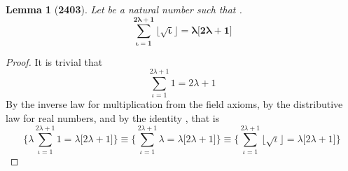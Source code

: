 \documentclass[preview]{standalone}
\newtheorem*{lemma*}{Lemma}
\begin{document}
\begin{lemma*}[\textbf{2403}]
    Let \bm{$\iota$} be a natural number such that
    \bm{$\big \lfloor \sqrt \iota \big \rfloor = \lambda$}.
    \begin{equation*}
        \bm{
            \sum_{\iota=1}^{2 \lambda + 1} 
                    \big \lfloor \sqrt \iota \big \rfloor
                =
            \lambda \big[ 2 \lambda + 1 \big]
        }
    \end{equation*}
\end{lemma*}

\begin{proof}
    It is trivial that
    \begin{equation*}
        \sum_{\iota=1}^{2 \lambda + 1} 
                1 = 2 \lambda + 1
    \end{equation*}
    By the inverse law for multiplication from the field axioms,
    by the distributive law for real numbers, and by the identity \bm{$\lambda$},
    that is
    \begin{equation*}
        \Bigg\{
            \lambda \sum_{\iota=1}^{2 \lambda + 1} 1 = \lambda \big[ 2 \lambda + 1 \big]
        \Bigg\}
                \equiv
        \Bigg\{
            \sum_{\iota=1}^{2 \lambda + 1} \lambda = \lambda \big[ 2 \lambda + 1 \big]
        \Bigg\}
            \equiv
        \Bigg\{
            \sum_{\iota=1}^{2 \lambda + 1} \big \lfloor \sqrt \iota \big \rfloor
                = 
            \lambda \big[ 2 \lambda + 1 \big]
        \Bigg\}
    \end{equation*}
\color{lightgray} \end{proof}
\end{document}
